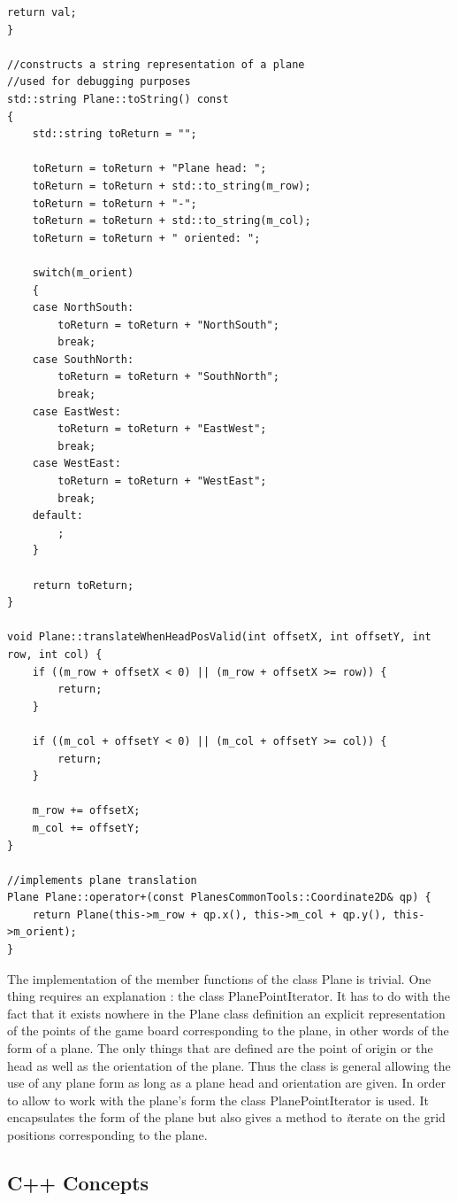 \begin{lstlisting}[caption = {Plane Class Methods}, label=plane_implementation]
    return val;
}

//constructs a string representation of a plane
//used for debugging purposes
std::string Plane::toString() const
{
    std::string toReturn = "";

    toReturn = toReturn + "Plane head: ";
    toReturn = toReturn + std::to_string(m_row);
    toReturn = toReturn + "-";
    toReturn = toReturn + std::to_string(m_col);
    toReturn = toReturn + " oriented: ";

    switch(m_orient)
    {
    case NorthSouth:
        toReturn = toReturn + "NorthSouth";
        break;
    case SouthNorth:
        toReturn = toReturn + "SouthNorth";
        break;
    case EastWest:
        toReturn = toReturn + "EastWest";
        break;
    case WestEast:
        toReturn = toReturn + "WestEast";
        break;
    default:
        ;
    }

    return toReturn;
}

void Plane::translateWhenHeadPosValid(int offsetX, int offsetY, int row, int col) {
    if ((m_row + offsetX < 0) || (m_row + offsetX >= row)) {
        return;
    }

    if ((m_col + offsetY < 0) || (m_col + offsetY >= col)) {
        return;
    }

    m_row += offsetX;
    m_col += offsetY;
}

//implements plane translation
Plane Plane::operator+(const PlanesCommonTools::Coordinate2D& qp) {
    return Plane(this->m_row + qp.x(), this->m_col + qp.y(), this->m_orient);
}
\end{lstlisting}

The implementation of the member functions of the class Plane is trivial. One thing requires an explanation : the class PlanePointIterator. It has to do with the fact that it exists nowhere in the Plane class definition an explicit representation of the points of the game board corresponding to the plane, in other words of the form of a plane. The only things that are defined are the point of origin or the head as well as the orientation of the plane. Thus the class is general allowing the use of any plane form as long as a plane head and orientation are given. In order to allow to work with the plane's form the class PlanePointIterator is used. It encapsulates the form of the plane but also gives a method to \textit iterate on the grid positions corresponding to the plane. 

\subsection {C++ Concepts}

